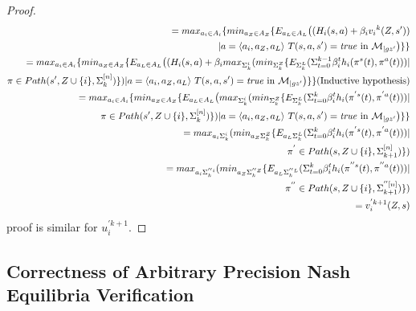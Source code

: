 \begin{proof}
	\begin{equation}
	\begin{split}
	=max_{a_i \in A_i} \{min_{a_{Z} \in A_{Z}}\{
	E_{a_L \in A_{L}}\big((H_i(s,a) + \beta_i{v_i}^{k}(Z,s'))\\
	 |a= \langle a_i,a_Z,a_L\rangle \  T(s,a,s')=\mathit{true}\ \text{in}\ \mathcal{M}_{|gz'} \big)\} \} \notag\\
	 =max_{a_i \in A_i} \{min_{a_{Z} \in A_{Z}}\{
	 	E_{a_L \in A_{L}}\big((H_i(s,a) + \beta_imax_{\Sigma^{i}_k}
	 	(min_{\Sigma^{Z}_k}
	 	\{E_{\Sigma^{L}_k}
	 	(\Sigma_{t=0}^{k-1} \beta_i^{t}h_{i}(\pi^{s}(t),\pi^{a}(t))) |\\ \pi \in Path(s',Z\cup \{i\},\Sigma^{[n]}_k)\})
	 	|a= \langle a_i,a_Z,a_L\rangle \  T(s,a,s')=\mathit{true}\ \text{in}\ \mathcal{M}_{|gz'} \big)\} \} \text{(Inductive hypothesis)} \notag\\
	 	=max_{a_i \in A_i} \{min_{a_{Z} \in A_{Z}}\{
	 	E_{a_L \in A_{L}}\big(max_{\Sigma^{i}_k}
	 	(min_{\Sigma^{Z}_k}
	 	\{E_{\Sigma^{L}_k}
	 	(\Sigma_{t=0}^{k} \beta_i^{t}h_{i}(\pi^{'s}(t),\pi^{'a}(t))) |\\ \pi \in Path(s',Z\cup \{i\},\Sigma^{[n]}_k)\})
	 	|a= \langle a_i,a_Z,a_L\rangle \  T(s,a,s')=\mathit{true}\ \text{in}\ \mathcal{M}_{|gz'} \big) \} \} \notag\\	 	
=
max_{a_i\Sigma^{i}_k}
(min_{a_Z\Sigma^{Z}_k}
\{E_{a_L\Sigma^{L}_k}
(\Sigma_{t=0}^{k} \beta_i^{t}h_{i}(\pi^{'s}(t),\pi^{'a}(t))) |\\ \pi^{'} \in Path(s,Z\cup \{i\},\Sigma^{[n]}_{k+1})\})\notag\\
=
max_{a_i\Sigma^{''i}_k}
(min_{a_Z\Sigma^{''Z}_k}
\{E_{a_L\Sigma^{''L}_k}
(\Sigma_{t=0}^{k} \beta_i^{t}h_{i}(\pi^{''s}(t),\pi^{''a}(t))) |\\ \pi^{''} \in Path(s,Z\cup \{i\},\Sigma^{''[n]}_{k+1})\})\notag\\
=v_i^{'k+1}(Z,s)
	\end{split}
	\end{equation}	
	proof is similar for $u_i^{'k+1}$.

\end{proof}

\subsection{Correctness of Arbitrary Precision Nash Equilibria Verification}
 
